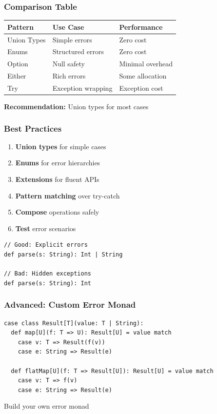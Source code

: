 \documentclass{beamer}
\begin{document}
\begin{frame}[fragile]
\frametitle{Comparison Table}

\begin{table}[ht]
\centering
\small
\begin{tabular}{|l|l|l|}
\hline
\textbf{Pattern} & \textbf{Use Case} & \textbf{Performance} \\
\hline
Union Types & Simple errors & Zero cost \\
\hline
Enums & Structured errors & Zero cost \\
\hline
Option & Null safety & Minimal overhead \\
\hline
Either & Rich errors & Some allocation \\
\hline
Try & Exception wrapping & Exception cost \\
\hline
\end{tabular}
\end{table}

\textbf{Recommendation:} Union types for most cases

\end{frame}

\begin{frame}[fragile]
\frametitle{Best Practices}

\begin{enumerate}
\item \textbf{Union types} for simple cases
\item \textbf{Enums} for error hierarchies  
\item \textbf{Extensions} for fluent APIs
\item \textbf{Pattern matching} over try-catch
\item \textbf{Compose} operations safely
\item \textbf{Test} error scenarios
\end{enumerate}

\begin{lstlisting}[style=scalaStyle]
// Good: Explicit errors
def parse(s: String): Int | String

// Bad: Hidden exceptions  
def parse(s: String): Int
\end{lstlisting}

\end{frame}

\begin{frame}[fragile]
\frametitle{Advanced: Custom Error Monad}

\begin{lstlisting}[style=scalaStyle]
case class Result[T](value: T | String):
  def map[U](f: T => U): Result[U] = value match
    case v: T => Result(f(v))
    case e: String => Result(e)
  
  def flatMap[U](f: T => Result[U]): Result[U] = value match
    case v: T => f(v)
    case e: String => Result(e)
\end{lstlisting}

Build your own error monad

\end{frame}
\end{document}
